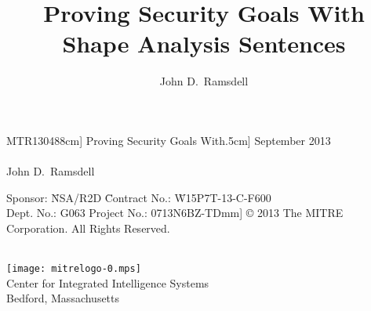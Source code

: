 \documentclass[titlepage,12pt]{article}
\title{Proving Security Goals With \\ Shape Analysis Sentences}
\author{John D.\ Ramsdell}
\newif\ifmtr
\begin{document}
\ifmtr








\begin{titlepage}
\begin{trivlist}\sffamily\bfseries\large
\item
MTR130488\1cm]
\LARGE
Proving Security Goals With\2.5cm]
\large
September 2013\\
~\\
\mdseries
John D.~Ramsdell
\vfill
\normalsize
\bfseries
\begingroup\footnotesize
\begin{tabbing}
Sponsor: \phantom{spo} \= NSA/R2D \phantom{phantom} \=
Contract No.: \phantom{pro}\= W15P7T-13-C-F600 \\
Dept. No.: \>G063 \>Project No.: \>0713N6BZ-TD\4mm]
{\copyright} 2013 The MITRE Corporation. All Rights Reserved.
\end{tabbing}
\endgroup
~\\
\noindent
\texttt{[image: mitrelogo-0.mps]}\\
Center for Integrated Intelligence Systems\\
Bedford, Massachusetts
\end{trivlist}
\end{titlepage}
\end{document}
